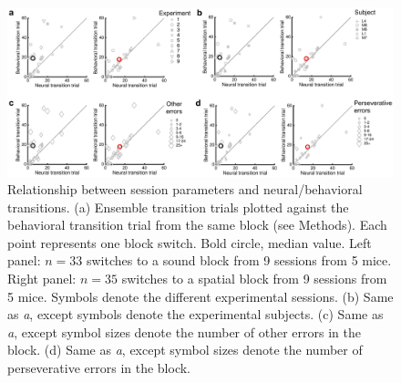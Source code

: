 \begin{figure}[htbp]

\begin{center}
\includegraphics[width=\textwidth]{Figures/Chapter3/NN_figS6.jpg} 
\end{center}

\caption[Relationship between session parameters and neural/behavioral transitions]
{
Relationship between session parameters and neural/behavioral transitions.
(a) Ensemble transition trials plotted against the behavioral transition trial from the same block (see Methods). Each point represents one block switch. Bold circle, median value. Left panel: $n=33$ switches to a sound block from 9 sessions from 5 mice. Right panel: $n=35$ switches to a spatial block from 9 sessions from 5 mice. Symbols denote the different experimental sessions. (b) Same as \emph{a}, except symbols denote the experimental subjects. (c) Same as \emph{a}, except symbol sizes denote the number of other errors in the block. (d) Same as \emph{a}, except symbol sizes denote the number of perseverative errors in the block.
}

\label{fig:NN_figS6}
\end{figure}